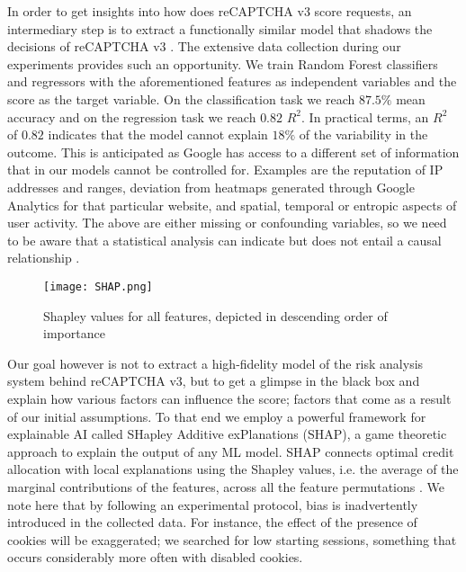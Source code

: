 In order to get insights into how does reCAPTCHA v3 score requests, an intermediary step is to extract a functionally similar model that shadows the decisions of reCAPTCHA v3 \cite{jagielski2020high, bastani2017interpreting}.
The extensive data collection during our experiments provides such an opportunity.
We train Random Forest classifiers and regressors \cite{liaw2002classification} with the aforementioned features as independent variables and the score as the target variable.
On the classification task we reach $87.5\%$ mean accuracy and on the regression task we reach $0.82$ $R^2$.
In practical terms, an $R^2$ of $0.82$ indicates that the model cannot explain $18\%$ of the variability in the outcome.
This is anticipated as Google has access to a different set of information that in our models cannot be controlled for.
Examples are the reputation of IP addresses and ranges, deviation from heatmaps generated through Google Analytics for that particular website, and spatial, temporal or entropic aspects of user activity.
The above are either missing or confounding variables, so we need to be aware that a statistical analysis can indicate but does not entail a causal relationship \cite{scholkopf2019causality}.

\begin{figure}[b]
\centerline{\texttt{[image: SHAP.png]}}
\caption{Shapley values for all features, depicted in descending order of importance}
\label{shap}
\end{figure}

Our goal however is not to extract a high-fidelity model of the risk analysis system behind reCAPTCHA v3, but to get a glimpse in the black box and explain how various factors can influence the score; factors that come as a result of our initial assumptions.
To that end we employ a powerful framework for explainable AI called SHapley Additive exPlanations (SHAP), a game theoretic approach to explain the output of any \gls{ML} model.
SHAP connects optimal credit allocation with local explanations using the Shapley values, i.e. the average of the marginal contributions of the features, across all the feature permutations \cite{lundberg2017unified}.
We note here that by following an experimental protocol, bias is inadvertently introduced in the collected data.
For instance, the effect of the presence of cookies will be exaggerated; we searched for low starting sessions, something that occurs considerably more often with disabled cookies.

